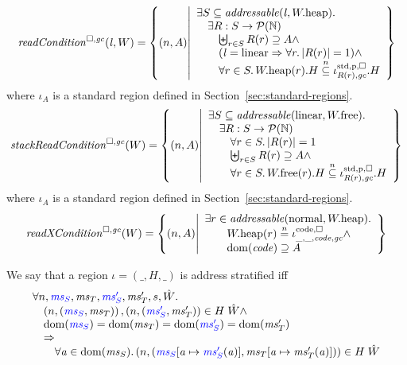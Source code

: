 \documentclass[a4paper]{article}
\begin{document}
\[
  \readCond{\lin,W} = \left\{ \npair{A} \middle| 
    \begin{array}{l}
      \exists S \subseteq \addressable{\lin, \pwheap} \ldotp \\
      \quad \exists R : S \fun \powerset{\nats} \\
      \qquad \biguplus_{r\in S} R(r) \supseteq A \wedge\\
      \qquad (\lin = \linear \Rightarrow \forall r\ldotp |R(r)|  = 1) \wedge\\
      \qquad \forall r \in S \ldotp \pwheap(r).H \nsubeq \stdreg{R(r),\gc}{\pur}.H
    \end{array}
  \right\}
\]
where $\iota_A$ is a standard region defined in Section~\ref{sec:standard-regions}.
\[
  \stackReadCond{W} = \left\{ \npair{A} \middle| 
    \begin{array}{l}
      \exists S \subseteq \addressable{\linear, \pwfree} \ldotp \\
      \quad \exists R : S \fun \powerset{\nats} \\
      \qquad \forall r \in S \ldotp |R(r)| = 1\\
      \qquad \biguplus_{r\in S} R(r) \supseteq A \wedge \\
      \qquad \forall r \in S \ldotp \pwfree(r).H \nsubeq \stdreg{R(r),\gc}{\pur}.H
    \end{array}
  \right\}
\]
where $\iota_A$ is a standard region defined in Section~\ref{sec:standard-regions}.
\[
  \xReadCond{W} = \left\{ \npair{A} \middle| 
    \begin{array}{l}
      \exists r \in \addressable{\normal, \pwheap} \ldotp \\
      \qquad \pwheap(r) \nequal \codereg{\_,\_,\code,\gc}\wedge\\
      \qquad \dom(\code) \supseteq A 
    \end{array}
  \right\}
\]

\begin{definition}
  \label{def:address-stratified}
  We say that a region $\iota = (\_,H,\_)$ is address stratified iff
  \[
    \begin{array}{l}
      \forall n, \src{\ms_S},\ms_T,\src{\ms_S'},\ms_T',s,\hat{W}\ldotp \\
      \quad \npair{\stpair{\ms}{\ms}}, \npair{\stpair[.]{\ms_S'}{\ms_T'}} \in H \; \hat{W} \wedge \\
      \quad \dom(\src{\ms_S}) = \dom(\ms_T) = \dom(\src{\ms_S'}) = \dom(\ms_T') \\
      \quad \Rightarrow \\
      \qquad \forall \aaddr \in \dom(\ms_S) \ldotp \npair{(\src{\ms_S}\update{\aaddr}{\src{\ms_S'}(\aaddr)},\ms_T\update{\aaddr}{\ms_T'(\aaddr)})} \in H \; \hat{W}
    \end{array}
  \]
\end{definition}
\end{document}
